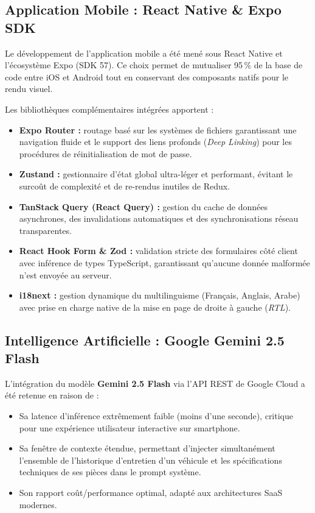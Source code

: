 \documentclass[12pt,a4paper,twoside,openright]{report}
\newcommand{\itembullet}{\textcolor{secondaryBlue}{$\blacktriangleright$}}
\begin{document}
  \subsection{Application Mobile : React Native \& Expo SDK}
  \begin{techDecision}
  Le d\'eveloppement de l'application mobile a \'et\'e men\'e sous React Native et l'\'ecosyst\`eme Expo (SDK 57). Ce choix permet de mutualiser 95\,\% de la base de code entre iOS et Android tout en conservant des composants natifs pour le rendu visuel.
  \end{techDecision}

  Les biblioth\`eques compl\'ementaires int\'egr\'ees apportent :
  \begin{itemize}[label=\itembullet]
    \item \textbf{Expo Router :} routage bas\'e sur les syst\`emes de fichiers garantissant une navigation fluide et le support des liens profonds (\textit{Deep Linking}) pour les proc\'edures de r\'einitialisation de mot de passe.
    \item \textbf{Zustand :} gestionnaire d'\'etat global ultra-l\'eger et performant, \'evitant le surco\^ut de complexit\'e et de re-rendus inutiles de Redux.
    \item \textbf{TanStack Query (React Query) :} gestion du cache de donn\'ees asynchrones, des invalidations automatiques et des synchronisations r\'eseau transparentes.
    \item \textbf{React Hook Form \& Zod :} validation stricte des formulaires c\^ot\'e client avec inf\'erence de types TypeScript, garantissant qu'aucune donn\'ee malform\'ee n'est envoy\'ee au serveur.
    \item \textbf{i18next :} gestion dynamique du multilinguisme (Fran\c{c}ais, Anglais, Arabe) avec prise en charge native de la mise en page de droite \`a gauche (\textit{RTL}).
  \end{itemize}

  \subsection{Intelligence Artificielle : Google Gemini 2.5 Flash}
  L'int\'egration du mod\`ele \textbf{Gemini 2.5 Flash} via l'API REST de Google Cloud a \'et\'e retenue en raison de :
  \begin{itemize}[label=\itembullet]
    \item Sa latence d'inf\'erence extr\^emement faible (moins d'une seconde), critique pour une exp\'erience utilisateur interactive sur smartphone.
    \item Sa fen\^etre de contexte \'etendue, permettant d'injecter simultan\'ement l'ensemble de l'historique d'entretien d'un v\'ehicule et les sp\'ecifications techniques de ses pi\`eces dans le prompt syst\`eme.
    \item Son rapport co\^ut/performance optimal, adapt\'e aux architectures SaaS modernes.
  \end{itemize}
\end{document}
